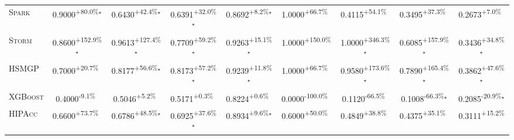 \begin{table}[htbp]
\begin{tabular}{l|cccc|cccc}
\textsc{Spark} & \cellcolor{green!30}0.9000\textsuperscript{+80.0\%}$^\star$ & \cellcolor{green!30}0.6430\textsuperscript{+42.4\%}$^\star$ & \cellcolor{green!30}0.6391\textsuperscript{+32.0\%}$^\star$ & \cellcolor{green!30}0.8692\textsuperscript{+8.2\%}$^\star$ & \cellcolor{green!30}1.0000\textsuperscript{+66.7\%}$^{\,\,\,}$ & \cellcolor{green!30}0.4115\textsuperscript{+54.1\%}$^{\,\,\,}$ & \cellcolor{green!30}0.3495\textsuperscript{+37.3\%}$^{\,\,\,}$ & \cellcolor{green!30}0.2673\textsuperscript{+7.0\%}$^{\,\,\,}$ \\
\textsc{Storm} & \cellcolor{green!30}0.8600\textsuperscript{+152.9\%}$^\star$ & \cellcolor{green!30}0.9613\textsuperscript{+127.4\%}$^\star$ & \cellcolor{green!30}0.7709\textsuperscript{+59.2\%}$^\star$ & \cellcolor{green!30}0.9263\textsuperscript{+15.1\%}$^\star$ & \cellcolor{green!30}1.0000\textsuperscript{+150.0\%}$^{\,\,\,}$ & \cellcolor{green!30}1.0000\textsuperscript{+346.3\%}$^\star$ & \cellcolor{green!30}0.6085\textsuperscript{+157.9\%}$^\star$ & \cellcolor{green!30}0.3436\textsuperscript{+34.8\%}$^\star$ \\
\textsc{HSMGP} & \cellcolor{green!30}0.7000\textsuperscript{+20.7\%}$^{\,\,\,}$ & \cellcolor{green!30}0.8177\textsuperscript{+56.6\%}$^\star$ & \cellcolor{green!30}0.8173\textsuperscript{+57.2\%}$^\star$ & \cellcolor{green!30}0.9239\textsuperscript{+11.8\%}$^\star$ & \cellcolor{green!30}1.0000\textsuperscript{+66.7\%}$^{\,\,\,}$ & \cellcolor{green!30}0.9580\textsuperscript{+173.6\%}$^\star$ & \cellcolor{green!30}0.7890\textsuperscript{+165.4\%}$^\star$ & \cellcolor{green!30}0.3862\textsuperscript{+47.6\%}$^\star$ \\
\textsc{XGBoost} & \cellcolor{red!30}0.4000\textsuperscript{-9.1\%}$^{\,\,\,}$ & \cellcolor{green!30}0.5046\textsuperscript{+5.2\%}$^{\,\,\,}$ & \cellcolor{green!30}0.5171\textsuperscript{+0.3\%}$^{\,\,\,}$ & \cellcolor{green!30}0.8224\textsuperscript{+0.6\%}$^{\,\,\,}$ & \cellcolor{red!30}0.0000\textsuperscript{-100.0\%}$^{\,\,\,}$ & \cellcolor{red!30}0.1120\textsuperscript{-66.5\%}$^{\,\,\,}$ & \cellcolor{red!30}0.1008\textsuperscript{-66.3\%}$^\star$ & \cellcolor{red!30}0.2085\textsuperscript{-20.9\%}$^\star$ \\
\textsc{HIPAcc} & \cellcolor{green!30}0.6600\textsuperscript{+73.7\%}$^{\,\,\,}$ & \cellcolor{green!30}0.6786\textsuperscript{+48.5\%}$^\star$ & \cellcolor{green!30}0.6925\textsuperscript{+37.6\%}$^\star$ & \cellcolor{green!30}0.8934\textsuperscript{+9.6\%}$^\star$ & \cellcolor{green!30}0.6000\textsuperscript{+50.0\%}$^{\,\,\,}$ & \cellcolor{green!30}0.4849\textsuperscript{+38.8\%}$^{\,\,\,}$ & \cellcolor{green!30}0.4375\textsuperscript{+35.1\%}$^{\,\,\,}$ & \cellcolor{green!30}0.3111\textsuperscript{+15.2\%}$^{\,\,\,}$ \\

\end{tabular}
\end{table}
